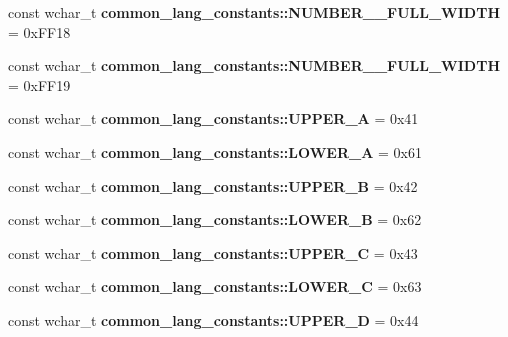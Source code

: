\begin{DoxyCompactItemize}
\item 
\hypertarget{group___indexing_gaade1f8310ff8681d6407c62c96f7c96d}{const wchar\-\_\-t {\bfseries common\-\_\-lang\-\_\-constants\-::\-N\-U\-M\-B\-E\-R\-\_\-\_\-\-F\-U\-L\-L\-\_\-\-W\-I\-D\-T\-H} = 0x\-F\-F18}\label{group___indexing_gaade1f8310ff8681d6407c62c96f7c96d}

\item 
\hypertarget{group___indexing_ga3b302523ae934ed3a281ca00c19e1372}{const wchar\-\_\-t {\bfseries common\-\_\-lang\-\_\-constants\-::\-N\-U\-M\-B\-E\-R\-\_\-\_\-\-F\-U\-L\-L\-\_\-\-W\-I\-D\-T\-H} = 0x\-F\-F19}\label{group___indexing_ga3b302523ae934ed3a281ca00c19e1372}

\item 
\hypertarget{group___indexing_ga7a78db0c937e07a0bf713cd99f5fad6a}{const wchar\-\_\-t {\bfseries common\-\_\-lang\-\_\-constants\-::\-U\-P\-P\-E\-R\-\_\-\-A} = 0x41}\label{group___indexing_ga7a78db0c937e07a0bf713cd99f5fad6a}

\item 
\hypertarget{group___indexing_ga866a9303557020899b505e70c1ff96f9}{const wchar\-\_\-t {\bfseries common\-\_\-lang\-\_\-constants\-::\-L\-O\-W\-E\-R\-\_\-\-A} = 0x61}\label{group___indexing_ga866a9303557020899b505e70c1ff96f9}

\item 
\hypertarget{group___indexing_ga450910041c34b865d194e961d9b68595}{const wchar\-\_\-t {\bfseries common\-\_\-lang\-\_\-constants\-::\-U\-P\-P\-E\-R\-\_\-\-B} = 0x42}\label{group___indexing_ga450910041c34b865d194e961d9b68595}

\item 
\hypertarget{group___indexing_ga2676adf161098497f44ccf1867ec6de8}{const wchar\-\_\-t {\bfseries common\-\_\-lang\-\_\-constants\-::\-L\-O\-W\-E\-R\-\_\-\-B} = 0x62}\label{group___indexing_ga2676adf161098497f44ccf1867ec6de8}

\item 
\hypertarget{group___indexing_ga9fbc55255d941822defb0849245bbb1c}{const wchar\-\_\-t {\bfseries common\-\_\-lang\-\_\-constants\-::\-U\-P\-P\-E\-R\-\_\-\-C} = 0x43}\label{group___indexing_ga9fbc55255d941822defb0849245bbb1c}

\item 
\hypertarget{group___indexing_gae70a85a535d5e86769eda71ca763f02e}{const wchar\-\_\-t {\bfseries common\-\_\-lang\-\_\-constants\-::\-L\-O\-W\-E\-R\-\_\-\-C} = 0x63}\label{group___indexing_gae70a85a535d5e86769eda71ca763f02e}

\item 
\hypertarget{group___indexing_ga56b8c46d9f6772153d05b11d8e46d013}{const wchar\-\_\-t {\bfseries common\-\_\-lang\-\_\-constants\-::\-U\-P\-P\-E\-R\-\_\-\-D} = 0x44}\label{group___indexing_ga56b8c46d9f6772153d05b11d8e46d013}


\end{DoxyCompactItemize}
